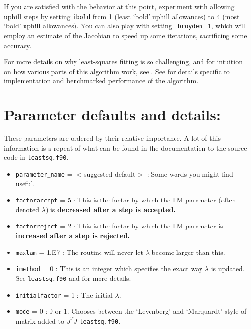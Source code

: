 \documentclass[12pt,pdf,singlespace]{article}
\begin{document}
If you are satisfied with the behavior at this point, experiment with allowing uphill steps by setting \texttt{ibold} from 1 (least `bold'  uphill allowances) to 4 (most `bold' uphill allowances). You can also play with setting \texttt{ibroyden}=1, which will employ an estimate of the Jacobian to speed up some iterations, sacrificing some accuracy.

For more details on why least-squares fitting is so challenging, and for intuition on how various parts of this algorithm work, see \cite{PRL104, PRE83}. See \cite{transtrum2012improvements} for details specific to implementation and benchmarked performance of the algorithm.


\section{Parameter defaults and details:}

These parameters are ordered by their relative importance. A lot of this information is a repeat of what can be found in the documentation to the source code in \texttt{leastsq.f90}.
~\\

\begin{itemize}
	\item \texttt{parameter\_name} = $<$suggested default$>$ : Some words you might find useful.
\end{itemize}

\begin{itemize}
	\item \texttt{factoraccept} = 5 : This is the factor by which the LM parameter (often denoted $\lambda$) is {\bf decreased after a step is accepted.}
	\item \texttt{factorreject} = 2 : This is the factor by which the LM parameter is {\bf increased after a step is rejected.}
	\item \texttt{maxlam} = 1.E7 : The routine will never let $\lambda$ become larger than this.
	\item \texttt{imethod} = 0 : This is an integer which specifies the exact way $\lambda$ is updated. See \texttt{leastsq.f90} and \cite{transtrum2012improvements} for more details.
	\item \texttt{initialfactor} = 1 : The initial $\lambda$.
	\item \texttt{mode} = 0 : 0 or 1. Chooses between the `Levenberg' and `Marquardt' style of matrix added to $J^T J$ \texttt{leastsq.f90}.
\end{itemize}
\end{document}
